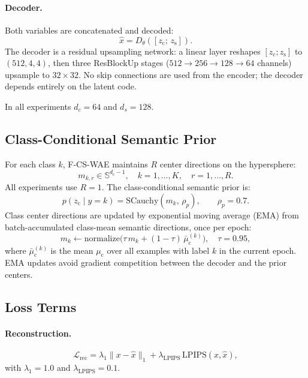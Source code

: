 \documentclass[10pt]{article}
\newcommand{\ours}{F-CS-WAE}
\newcommand{\zc}{z_{\mathrm{c}}}
\newcommand{\zs}{z_{\mathrm{s}}}
\newcommand{\muc}{\mu_{\mathrm{c}}}
\newcommand{\Sph}{\mathbb{S}}
\newcommand{\SCauchy}{\mathrm{SCauchy}}
\begin{document}
\paragraph{Decoder.}
Both variables are concatenated and decoded:
\begin{equation}
  \hat{x} = D_\theta([\zc;\,\zs]).
  \label{eq:decoder}
\end{equation}
The decoder is a residual upsampling network: a linear layer reshapes $[\zc;\zs]$
to $(512,4,4)$, then three ResBlockUp stages
($512\to256\to128\to64$ channels) upsample to $32\times32$.
No skip connections are used from the encoder; the decoder depends entirely on the
latent code.

In all experiments $d_c=64$ and $d_s=128$.

\subsection{Class-Conditional Semantic Prior}

For each class $k$, \ours{} maintains $R$ center directions on the hypersphere:
\begin{equation}
  m_{k,r}\in\Sph^{d_c-1}, \quad k=1,\dots,K,\quad r=1,\dots,R.
\end{equation}
All experiments use $R=1$.
The class-conditional semantic prior is:
\begin{equation}
  p(\zc\mid y{=}k) = \SCauchy(m_k,\,\rho_p), \qquad \rho_p = 0.7.
  \label{eq:class-prior}
\end{equation}
Class center directions are updated by exponential moving average (EMA) from
batch-accumulated class-mean semantic directions, once per epoch:
\begin{equation}
  m_k \leftarrow \mathrm{normalize}\!\bigl(\tau\,m_k + (1-\tau)\,\bar\muc^{(k)}\bigr),
  \quad \tau=0.95,
  \label{eq:ema-update}
\end{equation}
where $\bar\muc^{(k)}$ is the mean $\muc$ over all examples with label $k$ in the
current epoch.
EMA updates avoid gradient competition between the decoder and the prior centers.

\subsection{Loss Terms}
\label{sec:losses}

\paragraph{Reconstruction.}
\begin{equation}
  \mathcal{L}_{\mathrm{rec}}
  = \lambda_1\|x-\hat{x}\|_1
  + \lambda_{\mathrm{LPIPS}}\,\mathrm{LPIPS}(x,\hat{x}),
  \label{eq:rec}
\end{equation}
with $\lambda_1=1.0$ and $\lambda_{\mathrm{LPIPS}}=0.1$.
\end{document}
